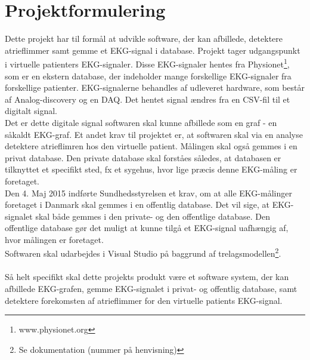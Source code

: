 \chapter{Projektformulering}

Dette projekt har til formål at udvikle software, der kan afbillede, detektere atrieflimmer samt gemme et EKG-signal i database. Projekt tager udgangspunkt i virtuelle patienters EKG-signaler. Disse EKG-signaler hentes fra Physionet\footnote{www.physionet.org}, som er en ekstern database, der indeholder mange forskellige EKG-signaler fra forskellige patienter. EKG-signalerne behandles af udleveret hardware, som består af Analog-discovery og en DAQ. Det hentet signal ændres fra en CSV-fil til et digitalt signal. \\
Det er dette digitale signal softwaren skal kunne afbillede som en graf - en såkaldt EKG-graf. Et andet krav til projektet er, at softwaren skal via en analyse detektere atrieflimren hos den virtuelle patient. Målingen skal også gemmes i en privat database. Den private database skal forståes således, at databasen er tilknyttet et specifikt sted, fx et sygehus, hvor lige præcis denne EKG-måling er foretaget. \\
Den 4. Maj 2015 indførte Sundhedsstyrelsen et krav, om at alle EKG-målinger foretaget i Danmark skal gemmes i en offentlig database. Det vil sige, at EKG-signalet skal både gemmes i den private- og den offentlige database. Den offentlige database gør det muligt at kunne tilgå et EKG-signal uafhængig af, hvor målingen er foretaget.\\
Softwaren skal udarbejdes i Visual Studio på baggrund af trelagsmodellen\footnote{Se dokumentation (nummer på henvisning)}.\\ \\
Så helt specifikt skal dette projekts produkt være et software system, der kan afbillede EKG-grafen, gemme EKG-signalet i privat- og offentlig database, samt detektere forekomsten af atrieflimmer for den virtuelle patients EKG-signal.  